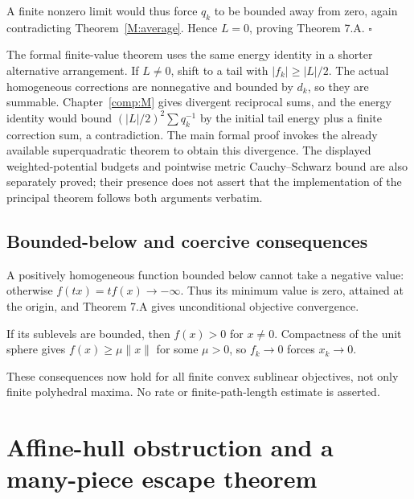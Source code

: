 A finite nonzero limit would thus force \(q_k\) to be bounded away from
zero, again contradicting Theorem~\ref{M:average}. Hence \(L=0\), proving Theorem 7.A.
\(\square\)

The formal finite-value theorem uses the same energy identity in a shorter alternative arrangement. If \(L\ne0\), shift to a tail with \(|f_k|\ge|L|/2\). The actual homogeneous corrections are nonnegative and bounded by \(d_k\), so they are summable. Chapter~\ref{comp:M} gives divergent reciprocal sums, and the energy identity would bound \((|L|/2)^2\sum q_k^{-1}\) by the initial tail energy plus a finite correction sum, a contradiction. The main formal proof invokes the already available superquadratic theorem to obtain this divergence. The displayed weighted-potential budgets and pointwise metric Cauchy--Schwarz bound are also separately proved; their presence does not assert that the implementation of the principal theorem follows both arguments verbatim.



\subsection{Bounded-below and coercive
consequences}\label{H:bounded-below-and-coercive-consequences}


A positively homogeneous function bounded below cannot take a negative
value: otherwise \(f(tx)=tf(x)\to-\infty\). Thus its minimum value is
zero, attained at the origin, and Theorem 7.A gives unconditional
objective convergence.

If its sublevels are bounded, then \(f(x)>0\) for \(x\ne0\). Compactness
of the unit sphere gives \(f(x)\ge\mu\|x\|\) for some \(\mu>0\), so
\(f_k\to0\) forces \(x_k\to0\).

These consequences now hold for all finite convex sublinear objectives,
not only finite polyhedral maxima. No rate or finite-path-length
estimate is asserted.


\setcounter{section}{5}
\setcounter{theorem}{0}
\setcounter{lemma}{0}
\setcounter{corollary}{0}
\setcounter{proposition}{0}
\setcounter{remark}{0}
\setcounter{equation}{0}


\section{Affine-hull obstruction and a many-piece escape
theorem}\label{H:affine-hull-obstruction-and-a-many-piece-escape-theorem}

